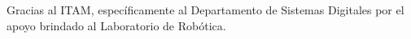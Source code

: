 \documentclass[twocolumn,10pt]{amrob}
\begin{document}








\begin{acknowledgment}
Gracias al ITAM, específicamente al Departamento de Sistemas Digitales por el apoyo brindado al Laboratorio de Robótica. 
\end{acknowledgment}

%
\end{document}

